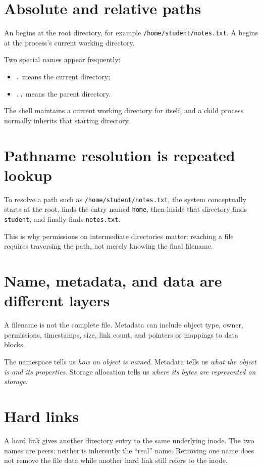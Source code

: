 \section{Absolute and relative paths}
An  begins at the root directory, for example \texttt{/home/student/notes.txt}. A  begins at the process's current working directory.

Two special names appear frequently:
\begin{itemize}
  \item \texttt{.} means the current directory;
  \item \texttt{..} means the parent directory.
\end{itemize}
The shell maintains a current working directory for itself, and a child process normally inherits that starting directory.

\section{Pathname resolution is repeated lookup}
To resolve a path such as \texttt{/home/student/notes.txt}, the system conceptually starts at the root, finds the entry named \texttt{home}, then inside that directory finds \texttt{student}, and finally finds \texttt{notes.txt}.

This is why permissions on intermediate directories matter: reaching a file requires traversing the path, not merely knowing the final filename.

\section{Name, metadata, and data are different layers}
A filename is not the complete file. Metadata can include object type, owner, permissions, timestamps, size, link count, and pointers or mappings to data blocks.

\begin{keyidea}
The namespace tells us \emph{how an object is named}. Metadata tells us \emph{what the object is and its properties}. Storage allocation tells us \emph{where its bytes are represented on storage}.
\end{keyidea}

\section{Hard links}
A hard link gives another directory entry to the same underlying inode. The two names are peers: neither is inherently the ``real'' name. Removing one name does not remove the file data while another hard link still refers to the inode.

